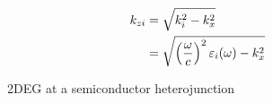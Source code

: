 \documentclass[mathserif,18pt,xcolor=table]{beamer}
\begin{document}
\begin{frame}
\begin{columns}
\begin{column}[T]{.5\textwidth}
\begin{equation}
\begin{split}
              k_{zi} & = \sqrt{k_i^2 - k_x^2} \\
              & = \sqrt{\left(\frac{\omega}{c}\right)^2 \varepsilon_i(\omega) -  k_x^2}
            \end{split}
            \label{eq:kz}
          \end{equation}
          \begin{figure}
            \def\svgwidth{\linewidth}
            
            \caption{2DEG at a semiconductor heterojunction}
          \end{figure}
          \end{column}%
        \end{columns}
      \end{frame}
\end{document}
